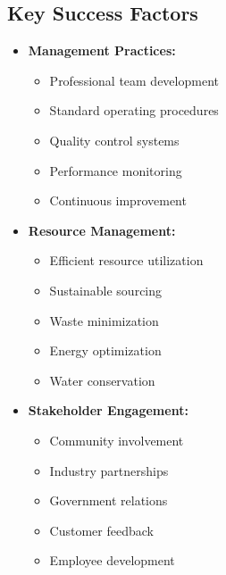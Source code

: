 \subsection{Key Success Factors}
\begin{itemize}
    \item \textbf{Management Practices:}
    \begin{itemize}
        \item Professional team development
        \item Standard operating procedures
        \item Quality control systems
        \item Performance monitoring
        \item Continuous improvement
    \end{itemize}
    
    \item \textbf{Resource Management:}
    \begin{itemize}
        \item Efficient resource utilization
        \item Sustainable sourcing
        \item Waste minimization
        \item Energy optimization
        \item Water conservation
    \end{itemize}
    
    \item \textbf{Stakeholder Engagement:}
    \begin{itemize}
        \item Community involvement
        \item Industry partnerships
        \item Government relations
        \item Customer feedback
        \item Employee development
    \end{itemize}
\end{itemize}

